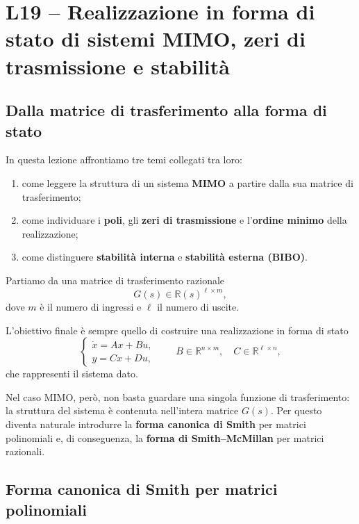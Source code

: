 
\chapter{L19 -- Realizzazione in forma di stato di sistemi MIMO, zeri di trasmissione e stabilità}
\label{chap:L19}

\section{Dalla matrice di trasferimento alla forma di stato}

In questa lezione affrontiamo tre temi collegati tra loro:
\begin{enumerate}
    \item come leggere la struttura di un sistema \textbf{MIMO} a partire dalla sua matrice di trasferimento;
    \item come individuare i \textbf{poli}, gli \textbf{zeri di trasmissione} e l'\textbf{ordine minimo} della realizzazione;
    \item come distinguere \textbf{stabilità interna} e \textbf{stabilità esterna (BIBO)}.
\end{enumerate}

Partiamo da una matrice di trasferimento razionale
\[
G(s)\in \mathbb{R}(s)^{\ell\times m},
\]
dove \(m\) è il numero di ingressi e \(\ell\) il numero di uscite.

L'obiettivo finale è sempre quello di costruire una realizzazione in forma di stato
\[
\begin{cases}
\dot x = Ax + Bu,\\
y = Cx + Du,
\end{cases}
\qquad
B\in\mathbb{R}^{n\times m},\quad
C\in\mathbb{R}^{\ell\times n},
\]
che rappresenti il sistema dato.

Nel caso MIMO, però, non basta guardare una singola funzione di trasferimento: la struttura del sistema è contenuta nell'intera matrice \(G(s)\). Per questo diventa naturale introdurre la \textbf{forma canonica di Smith} per matrici polinomiali e, di conseguenza, la \textbf{forma di Smith--McMillan} per matrici razionali.

\bigskip

\section{Forma canonica di Smith per matrici polinomiali}

